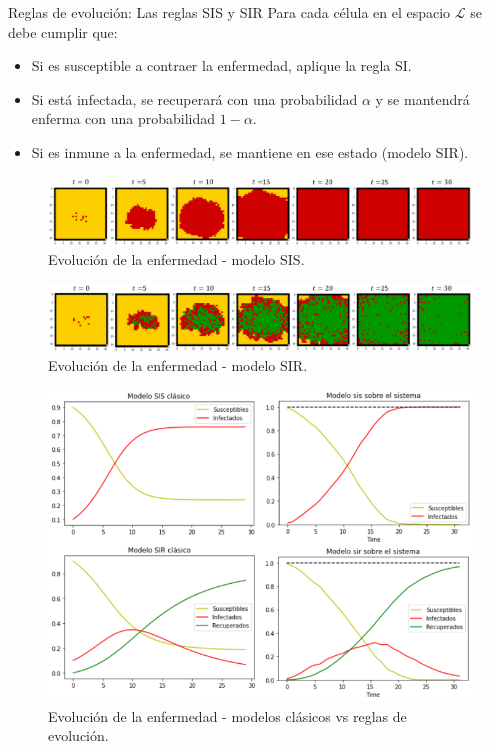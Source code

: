\documentclass[9pt]{beamer}
\begin{document}
\begin{frame}{Reglas de evolución: Las reglas SIS y SIR}
Para cada célula en el espacio $\mathcal{L}$ se debe cumplir que:
\begin{itemize}
    \item Si es susceptible a contraer la enfermedad, aplique la regla SI.
    \item Si está infectada, se recuperará con una probabilidad $\alpha$ y se mantendrá enferma con una probabilidad $1-\alpha$.
    \item Si es inmune a la enfermedad, se mantiene en ese estado (modelo SIR).
\end{itemize}
\begin{minipage}{0.5\textwidth}
\begin{figure}[h]
  \centering
 \includegraphics[width=1\textwidth]{Imagenes/sisEn30.PNG}
 \caption{Evolución de la enfermedad - modelo SIS.}
 \label{fig:sisEn30}
\end{figure}
\vspace{-0.5cm}
\begin{figure}[h]
  \centering
 \includegraphics[width=1\textwidth]{Imagenes/sirEn30.PNG}
 \caption{Evolución de la enfermedad - modelo SIR.}
 \label{fig:sirEn30}
\end{figure}
\end{minipage}
\hfill
\begin{minipage}{0.45\textwidth}
\begin{figure}[h]
  \centering
    \includegraphics[width=1\textwidth]{Imagenes/solucionesSISySIR1.PNG}
    \caption{Evolución de la enfermedad - modelos clásicos vs reglas de evolución.}
    \label{fig:sirEn30}
\end{figure}
\end{minipage}
\end{frame}
\end{document}
